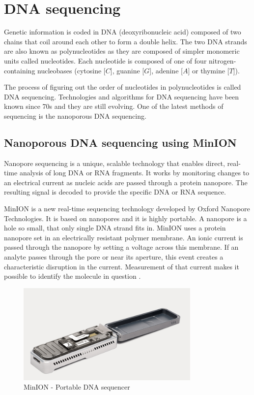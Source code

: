 \chapter{DNA sequencing}

\label{kap:dna_sequencing} %

Genetic information is coded in DNA (deoxyribonucleic acid) composed of two chains that coil around
each other to form a double helix. The two DNA strands are also known as polynucleotides as they are
composed of simpler monomeric units called nucleotides. Each nucleotide is composed of one of four
nitrogen-containing nucleobases (cytosine [$C$], guanine [$G$], adenine [$A$] or thymine [$T$]).

The process of figuring out the order of nucleotides in polynucleotides is called DNA sequencing.
Technologies and algorithms for DNA sequencing have been known since 70s and they are still
evolving. One of the latest methods of sequencing is the nanoporous DNA sequencing.

\section{Nanoporous DNA sequencing using MinION}


Nanopore sequencing is a unique, scalable technology that enables direct, real-time analysis of long
DNA or RNA fragments. It works by monitoring changes to an electrical current as nucleic acids are
passed through a protein nanopore. The resulting signal is decoded to provide the specific DNA or
RNA sequence.

MinION is a new real-time sequencing technology developed by Oxford Nanopore
Technologies. It is based on nanopores and it is highly portable. A nanopore is a hole so small,
that only single DNA strand fits in. MinION uses a protein nanopore set in an electrically resistant
polymer membrane. An ionic current is passed through the nanopore by setting a voltage across this
membrane. If an analyte passes through the pore or near its aperture, this event creates a
characteristic disruption in the current. Measurement of that current makes it possible to identify
the molecule in question \cite{first_look_minion}.

\begin{figure}
  \centerline{\includegraphics[width=0.8\textwidth]{images/minion}}
  \caption[MinION]{MinION - Portable DNA sequencer}
  \label{obr:minion}
\end{figure}

